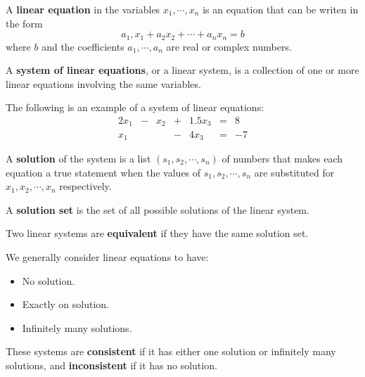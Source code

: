 

\begin{definition} A \textbf{linear equation} in the variables $x_1,\cdots,x_n$ is an equation that can be writen in the form
\[ a_1,x_1 + a_2x_2 + \cdots + a_nx_n = b \]
where $b$ and the coefficients $a_1,\cdots,a_n$ are real or complex numbers.
\end{definition}
\begin{definition}
A \textbf{system of linear equations}, or a linear system, is a collection of one or more linear equations involving the same variables.
\end{definition}
\begin{example}
The following is an example of a system of linear equations:
\[ \begin{array}{rrrrrrr} 2x_1 & - & x_2 & + & 1.5x_3 & = &  8 \\
						   x_1 &   &     & - &   4x_3 & = & -7 \end{array}\]
\end{example}
\begin{definition}
A \textbf{solution} of the system is a list $\left( s_1,s_2,\cdots,s_n \right)$ of numbers that makes each equation a true statement when the values of $s_1,s_2,\cdots,s_n$ are substituted for $x_1,x_2,\cdots,x_n$ respectively.
\end{definition}
\begin{definition}
A \textbf{solution set} is the set of all possible solutions of the linear system.
\end{definition}
\begin{definition}
Two linear systems are \textbf{equivalent} if they have the same solution set.
\end{definition}
We generally consider linear equations to have:
\begin{itemize}
\item No solution.
\item Exactly on solution.
\item Infinitely many solutions.
\end{itemize}
\begin{definition}
These systems are \textbf{consistent} if it has either one solution or infinitely many solutions, and \textbf{inconsistent} if it has no solution.
\end{definition}
